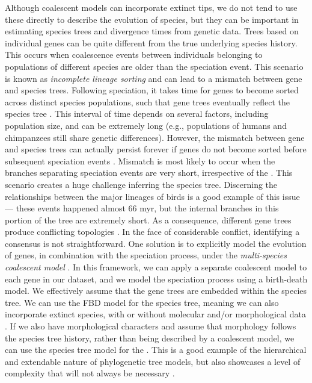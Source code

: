 Although coalescent models can incorporate extinct tips, we do not tend to use these directly to describe the evolution of species, but they can be important in estimating species trees and divergence times from genetic data. %
Trees based on individual genes can be quite different from the true underlying species history.
This occurs when coalescence events between individuals belonging to populations of different species are older than the speciation event.
This scenario is known as \textit{incomplete lineage sorting} and can lead to a mismatch between gene and species trees.
Following speciation, it takes time for genes to become sorted across distinct species populations, such that gene trees  eventually reflect the species tree \citep{Maddison2006}.
This interval of time depends on several factors, including population size, and can be extremely long (e.g., populations of humans and chimpanzees still share genetic differences).
However, the mismatch between gene and species trees can actually persist forever if genes do not become sorted before subsequent speciation events \citep{Xu2016}.
Mismatch is most likely to occur when the branches separating speciation events are very short, irrespective of the  . This scenario creates a huge challenge  inferring the species tree.
Discerning the relationships between the major lineages of birds is a good example of this issue --- these events happened almost 66 myr, but the internal branches in this portion of the tree are extremely short. As a consequence, different gene trees produce conflicting topologies \citep{Jarvis2014}.
In the face of considerable conflict, identifying a consensus is not straightforward.
One solution is to explicitly model the evolution of genes, in combination with the speciation process, under the \textit{multi-species coalescent model} \citep{Heled2010}.
In this framework, we can apply a separate coalescent model to each gene in our dataset, and we model the speciation process using a birth-death model.
We effectively assume that the gene trees are embedded within the species tree.
We can use the FBD model for the species tree, meaning we can also incorporate extinct species, with or without molecular and/or morphological data \citep{ogilvie2018}.
If we also have morphological characters and assume that morphology follows the species tree history, rather than being described by a coalescent model, we can use the species tree model for the .
This is a good example of the hierarchical and extendable nature of phylogenetic tree models, but also showcases a level of complexity that will not always be necessary .

